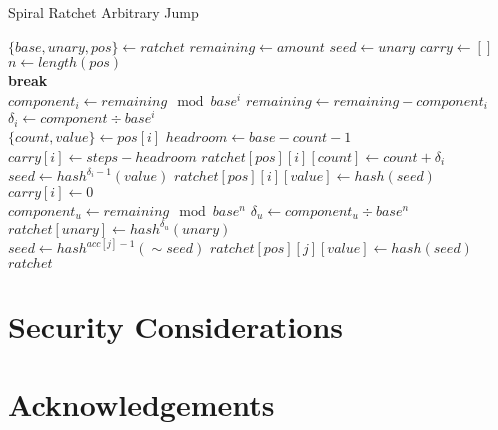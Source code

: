 \documentclass{article}
\begin{document}
	\begin{algorithm}
		\caption{Spiral Ratchet Arbitrary Jump}
		\label{alg:jump}
		
		\begin{algorithmic}[1]
				\State $\{base, unary, pos\} \gets ratchet$
				\State $remaining \gets amount$
				\State $seed \gets unary$
				\State $carry \gets []$
				\State $n \gets length(pos)$
				\\
						\State \textbf{break}
					\EndIf
					\\
					\State $component_{i} \gets remaining\mod{base^{i}}$
					\State $remaining \gets remaining - component_{i}$
					\State $\delta_{i} \gets component\div{base^{i}}$
					\\
					\State $\{count, value\} \gets pos[i]$
					\State $headroom \gets base - count - 1$
					\\
						\State $carry[i] \gets steps - headroom$
					\Else
						\State $ratchet[pos][i][count] \gets count + \delta_{i}$
							\State $seed \gets hash^{\delta_{i} - 	1}(value)$
							\State $ratchet[pos][i][value] \gets hash(seed)$
						\Else
							\State $carry[i] \gets 0$
						\EndIf
					\EndIf
				\EndFor
				\\
					\State $component_{u} \gets remaining \mod{base^{n}}$
					\State $\delta_{u} \gets component_{u}\div{base^{n}}$
					\State $ratchet[unary] \gets hash^{\delta_{u}}(unary)$
				\EndIf
				\\
				 
					\State $seed \gets hash^{acc[j] - 1}(\sim{seed})$
					\State $ratchet[pos][j][value] \gets hash(seed)$
				\EndFor
				\\
				\State $ratchet$
			\EndFunction
		\end{algorithmic}
	\end{algorithm}

	\section{Security Considerations}
    
    \newpage
    
    \section{Acknowledgements}
    
\end{document}

